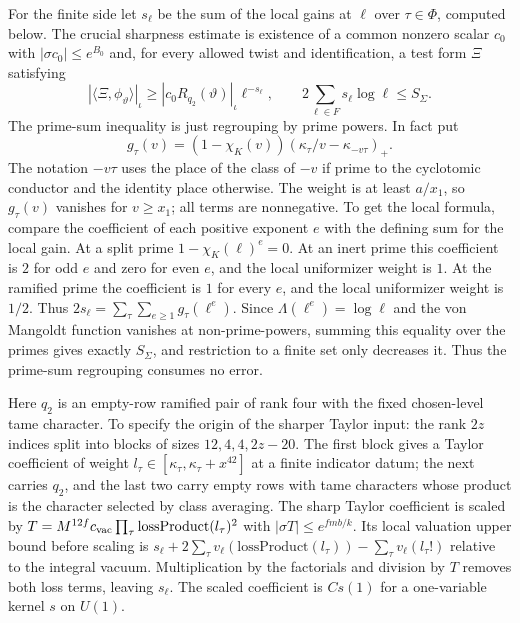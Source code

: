 For the finite side let $s_\ell$ be the sum of the local gains at $\ell$ over $\tau\in\Phi$, computed below.
The crucial sharpness estimate is existence of a common nonzero scalar
$c_0$ with $|\sigma c_0|\le e^{B_0}$ and, for every allowed twist and
identification, a test form $\Xi$ satisfying
\begin{equation}\label{c3:test}
 |\langle\Xi,\phi_\vartheta\rangle|_\iota
 \ge |c_0 R_{q_2}(\vartheta)|_\iota \ell^{-s_\ell},
 \qquad 2\sum_{\ell\in F}s_\ell\log\ell\le S_{\Sigma} .
\end{equation}
The prime-sum inequality is just regrouping by prime powers.
In fact put
\[
 g_\tau(v)=(1-\chi_K(v))
       (\kappa_\tau/v-\kappa_{-v\tau})_+ .
\]
The notation $-v\tau$ uses the place of the class of $-v$ if
prime to the cyclotomic conductor and the identity place otherwise.
The weight is at least $a/x_1$, so $g_\tau(v)$ vanishes for
$v\ge x_1$; all terms are nonnegative. To get the local formula, compare the coefficient of each positive
exponent $e$ with the defining sum for the local gain.
At a split prime $1-\chi_K(\ell)^e=0$. At an inert prime this
coefficient is $2$ for odd $e$ and zero for even $e$, and the
local uniformizer weight is $1$. At the ramified prime the
coefficient is $1$ for every $e$, and the local uniformizer
weight is $1/2$. Thus
$2s_\ell=\sum_\tau\sum_{e\ge1}g_\tau(\ell^e)$.
Since $\Lambda(\ell^e)=\log\ell$ and the von Mangoldt
function vanishes at non-prime-powers, summing this equality over
the primes gives exactly $S_{\Sigma}$, and restriction to a finite set
only decreases it. Thus the prime-sum regrouping consumes no error.

Here $q_2$ is an empty-row ramified pair of rank four with the fixed
chosen-level tame character. To specify the origin of the sharper
Taylor input:
the rank $2z$ indices split into blocks of sizes $12,4,4,2z-20$.
The first block gives a Taylor coefficient of weight
$l_\tau\in[\kappa_\tau,\kappa_\tau+x^{42}]$ at a finite indicator
datum; the next carries $q_2$, and the last two carry empty rows
with tame characters whose product is the character selected by
class averaging. The sharp Taylor coefficient is scaled by
$T=M^{12f}c_{\rm vac}\prod_\tau
\mathrm{lossProduct}(l_\tau)^2$ with
$|\sigma T|\le e^{fmb/k}$. Its local valuation upper bound before
scaling is $s_\ell+2\sum_\tau v_\ell(\mathrm{lossProduct}(l_\tau))
-\sum_\tau v_\ell(l_\tau!)$ relative to the integral vacuum.
Multiplication by the factorials and division by $T$ removes both
loss terms, leaving $s_\ell$. The scaled coefficient is $C s(1)$
for a one-variable kernel $s$ on $U(1)$.


